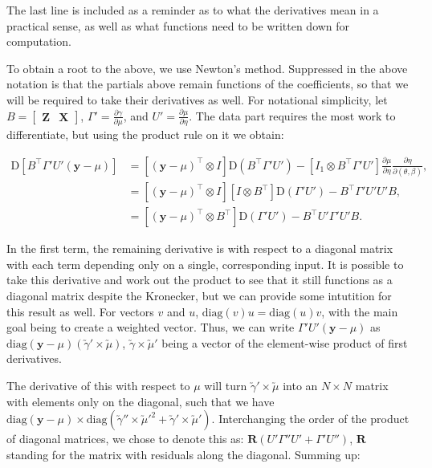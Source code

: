 \documentclass[10pt]{article}
\begin{document}
\noindent The last line is included as a reminder as to what the
derivatives mean in a practical sense, as well as what functions need
to be written down for computation.

To obtain a root to the above, we use Newton's method. Suppressed in
the above notation is that the partials above remain functions of the coefficients, so that we will be required to take their derivatives as
well. For notational simplicity, let $B = \begin{bmatrix}
  \bm{Z} & \bm{X} \end{bmatrix}$, $\Gamma' =
\frac{\partial\gamma}{\partial\mu}$, and $U' = \frac{\partial\mu}{\partial\eta}$. The data part requires the most work to differentiate, but
using the product rule on it we obtain:

\begin{align*}
\mathrm{D}\left[ B^\top \Gamma'U'(\bm{y} - \mu) \right] & =
\left[(\bm{y} - \mu)^\top \otimes I
\right] \mathrm{D}(B^\top\Gamma'U') -
\left[I_1 \otimes B^\top\Gamma'U'\right]
\frac{\partial\mu}{\partial\eta}\frac{\partial\eta}{\partial (\theta,
  \beta)}, \\
& = \left[(\bm{y} - \mu)^\top \otimes I
\right] \left[I \otimes B^\top\right] \mathrm{D}(\Gamma'U') - B^\top
\Gamma'U' U' B, \\
& = \left[(\bm{y} - \mu)^\top \otimes B^\top
\right] \mathrm{D}(\Gamma'U') - B^\top
U' \Gamma'U' B.
\end{align*}

\noindent In the first term, the remaining derivative is with respect
to a diagonal matrix with each term depending only on a single,
corresponding input. It is possible to take this derivative and
work out the product to see that it still functions as a diagonal matrix despite
the Kronecker, but we can provide some intutition for this result
as well. For vectors $v$ and $u$,
$\mathrm{diag}(v) u = \mathrm{diag}(u) v$, with the main goal being to
create a weighted vector. Thus, we can write $\Gamma'U'(\bm{y}
- \mu)$ as $\mathrm{diag}(\bm{y} - \mu)(\utilde{\gamma}' \times \utilde{\mu})$,
$\utilde{\gamma}\times\utilde{\mu}'$ being a vector of the
element-wise product of first derivatives.

The derivative of this with respect to $\mu$ will turn $\utilde{\gamma}'\times\utilde{\mu}$ into an $N\times N$ matrix with
elements only on the diagonal, such that we have
$\mathrm{diag}(\bm{y} -
\mu)\times\mathrm{diag}(\utilde{\gamma}''\times\utilde{\mu}'^2 +
\utilde{\gamma}'\times\utilde{\mu}')$. Interchanging
the order of the product of diagonal matrices, we chose to denote this
as: $\bm{R}(U'\Gamma''U' + \Gamma'U'')$, $\bm{R}$ standing
for the matrix with residuals along the diagonal. Summing up:
\end{document}
